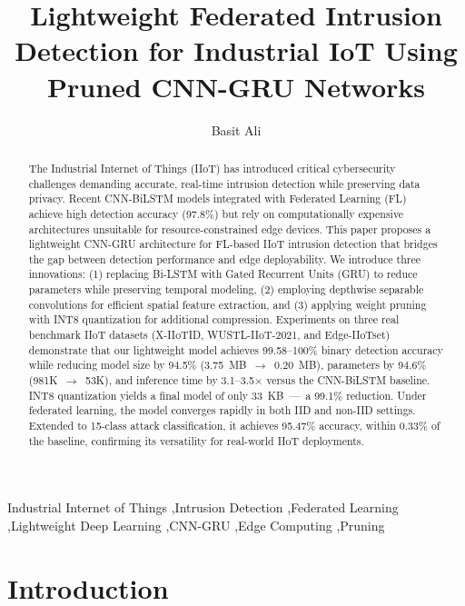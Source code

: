 \documentclass[preprint,12pt]{elsarticle}
\begin{document}
\begin{frontmatter}
\title{Lightweight Federated Intrusion Detection for Industrial IoT Using Pruned CNN-GRU Networks}

\author[awkum]{Basit Ali}

\address[awkum]{Abdul Wali Khan University Mardan, Mardan, Pakistan}

\begin{abstract}
The Industrial Internet of Things (IIoT) has introduced critical cybersecurity challenges demanding accurate, real-time intrusion detection while preserving data privacy. Recent CNN-BiLSTM models integrated with Federated Learning (FL) achieve high detection accuracy (97.8\%) but rely on computationally expensive architectures unsuitable for resource-constrained edge devices. This paper proposes a lightweight CNN-GRU architecture for FL-based IIoT intrusion detection that bridges the gap between detection performance and edge deployability. We introduce three innovations: (1) replacing Bi-LSTM with Gated Recurrent Units (GRU) to reduce parameters while preserving temporal modeling, (2) employing depthwise separable convolutions for efficient spatial feature extraction, and (3) applying weight pruning with INT8 quantization for additional compression. Experiments on three real benchmark IIoT datasets (X-IIoTID, WUSTL-IIoT-2021, and Edge-IIoTset) demonstrate that our lightweight model achieves 99.58--100\% binary detection accuracy while reducing model size by 94.5\% (3.75~MB~$\rightarrow$~0.20~MB), parameters by 94.6\% (981K~$\rightarrow$~53K), and inference time by 3.1--3.5$\times$ versus the CNN-BiLSTM baseline. INT8 quantization yields a final model of only 33~KB~---~a 99.1\% reduction. Under federated learning, the model converges rapidly in both IID and non-IID settings. Extended to 15-class attack classification, it achieves 95.47\% accuracy, within 0.33\% of the baseline, confirming its versatility for real-world IIoT deployments.
\end{abstract}

\begin{keyword}
Industrial Internet of Things \sep Intrusion Detection \sep Federated Learning \sep Lightweight Deep Learning \sep CNN-GRU \sep Edge Computing \sep Pruning
\end{keyword}
\end{frontmatter}

\section{Introduction}
\label{sec:intro}
\end{document}
